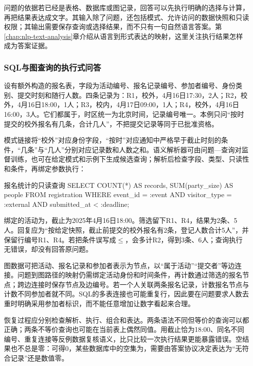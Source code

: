 问题的依据若已经是表格、数据库或图记录，回答可以先执行明确的选择与计算，再把结果表达成文字。其输入除了问题，还包括模式、允许访问的数据快照和只读权限；其输出需要保存查询或选择结果，而不只有一句自然语言答案。第\ref{chap:nlp-text-analysis}章介绍从语言到形式表达的映射，这里关注执行结果怎样成为答案证据。

\subsubsection{SQL与图查询的执行式问答}
\label{sec:nlp-dialogue-execution-qa}

设有额外构造的报名表，字段为活动编号、报名记录编号、参加者编号、身份类别、提交时刻和随行人数。四条记录为：R1，校外，4月16日17:30，2人；R2，校外，4月16日18:00，1人；R3，校内，4月17日09:00，1人；R4，校外，4月16日16:00，3人。它们都属于，时区统一为北京时间，记录编号唯一。本例只问“按时提交的校外报名有几条，合计几人”，不把提交记录等同于已批准资格。

模式链接将“校外”对应身份字段，“按时”对应通知中严格早于截止时刻的条件，“几条”与“几人”分别对应记录数和人数之和。语义解析器可由问题—查询对监督训练，也可在给定模式和示例下生成候选查询；解析后检查字段、类型、只读性和条件，再绑定参数执行：
\begin{codeblock}[language=SQL,label={code:nlp-dialogue-sql},unbreakable]{报名统计的只读查询}
SELECT COUNT(*) AS records,
       SUM(party_size) AS people
FROM registration
WHERE event_id = :event
  AND visitor_type = :external
  AND submitted_at < :deadline;
\end{codeblock}
绑定的活动为，截止为2025年4月16日18:00。筛选留下R1、R4，结果为2条、5人。回复应为“按给定快照，截止前提交的校外报名有2条，登记人数合计5人”，并保留行编号R1、R4。若把条件误写成$\leq$，会多计R2，得到3条、6人；查询执行无错误，却没有回答原问题。

图数据可把活动、报名记录和参加者表示为节点，以“属于活动”“提交者”等边连接。问题到图路径的映射仍需绑定活动身份和时间条件，再计数通过筛选的报名节点；跨边连接时保存节点及边编号。若一个人关联两条报名记录，计数报名节点与计数不同参加者就不同。SQL的多表连接也可能重复行，因此要在问题要求人数去重时明确采用参加者标识，而不能任意增加让数字看起来合理。

恢复过程应分别检查解析、执行、组合和表达。两条语法不同但等价的查询可以都正确；两条不等价查询也可能在当前表上偶然同值。用截止恰为18:00、同名不同编号、重复连接等反例数据复核语义，比只比较一次执行结果更能暴露错误。空结果也不总是零：可得0，某些数据库中的空集为，需要由答案协议决定表达为“无符合记录”还是数值零。

